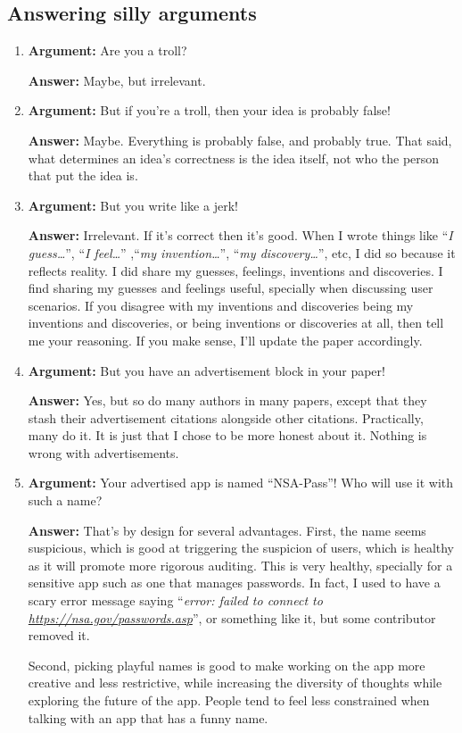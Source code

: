 \documentclass[twocolumn]{article}
\begin{document}
\subsection*{Answering silly arguments}
\begin{enumerate}
    \item \textbf{Argument:} Are you a troll?

    \textbf{Answer:} Maybe, but irrelevant.

    \item \textbf{Argument:} But if you're a troll, then your idea is
    probably false!

    \textbf{Answer:} Maybe.  Everything is probably false, and probably
    true.  That said, what determines an idea's correctness is the idea
    itself, not who the person that put the idea is.

    \item \textbf{Argument:} But you write like a jerk!

    \textbf{Answer:} Irrelevant.  If it's correct then it's good.  When I
    wrote things like ``\emph{I guess\ldots}'', ``\emph{I feel\ldots}''
    ,``\emph{my invention\ldots}'', ``\emph{my discovery\ldots}'', etc, I
    did so because it reflects reality.  I did share my guesses, feelings,
    inventions and discoveries.  I find sharing my guesses and feelings
    useful, specially when discussing user scenarios.  If you disagree with
    my inventions and discoveries being my inventions and discoveries, or
    being inventions or discoveries at all, then tell me your reasoning.
    If you make sense, I'll update the paper accordingly.

    \item \textbf{Argument:} But you have an advertisement block in your
    paper!

    \textbf{Answer:} Yes, but so do many authors in many papers, except
    that they stash their advertisement citations alongside other
    citations.  Practically, many do it.  It is just that I chose to be
    more honest about it.  Nothing is wrong with advertisements.

    \item \textbf{Argument:} Your advertised app is named ``NSA-Pass''!
    Who will use it with such a name?

    \textbf{Answer:} That's by design for several advantages.  First, the
    name seems suspicious, which is good at triggering the suspicion of
    users, which is healthy as it will promote more rigorous auditing.
    This is very healthy, specially for a sensitive app such as one that
    manages passwords.  In fact, I used to have a scary error message
    saying ``\emph{error:  failed to connect to
    \url{https://nsa.gov/passwords.asp}}'', or something like it, but
    some contributor removed it.

    Second, picking playful names is good to make working on the app more
    creative and less restrictive, while increasing the diversity of
    thoughts while exploring the future of the app.  People tend to feel
    less constrained when talking with an app that has a funny name.
\end{enumerate}
\end{document}
